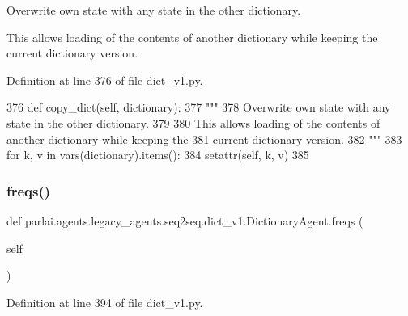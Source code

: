 \begin{DoxyVerb}Overwrite own state with any state in the other dictionary.

This allows loading of the contents of another dictionary while keeping the
current dictionary version.
\end{DoxyVerb}
 

Definition at line 376 of file dict\+\_\+v1.\+py.


\begin{DoxyCode}
376     \textcolor{keyword}{def }copy\_dict(self, dictionary):
377         \textcolor{stringliteral}{"""}
378 \textcolor{stringliteral}{        Overwrite own state with any state in the other dictionary.}
379 \textcolor{stringliteral}{}
380 \textcolor{stringliteral}{        This allows loading of the contents of another dictionary while keeping the}
381 \textcolor{stringliteral}{        current dictionary version.}
382 \textcolor{stringliteral}{        """}
383         \textcolor{keywordflow}{for} k, v \textcolor{keywordflow}{in} vars(dictionary).items():
384             setattr(self, k, v)
385 
\end{DoxyCode}
\mbox{\label{classparlai_1_1agents_1_1legacy__agents_1_1seq2seq_1_1dict__v1_1_1DictionaryAgent_a047820dad93a0e9af2aa649eb0a68e7c}} 
\subsubsection{\texorpdfstring{freqs()}{freqs()}}
{\footnotesize\ttfamily def parlai.\+agents.\+legacy\+\_\+agents.\+seq2seq.\+dict\+\_\+v1.\+Dictionary\+Agent.\+freqs (\begin{DoxyParamCaption}\item[{}]{self }\end{DoxyParamCaption})}



Definition at line 394 of file dict\+\_\+v1.\+py.


